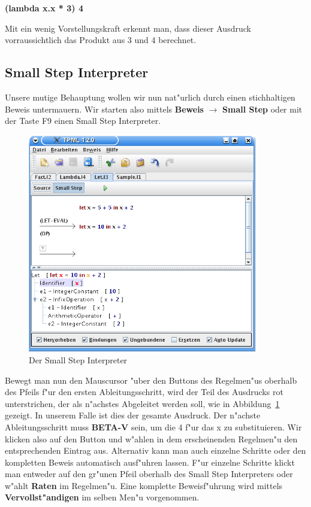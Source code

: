{\bf (lambda x.x * 3) 4}

Mit ein wenig Vorstellungskraft erkennt man, dass dieser Ausdruck
vorraussichtlich das Produkt aus 3 und 4 berechnet.


\subsection{Small Step Interpreter}
Unsere mutige Behauptung wollen wir nun nat"urlich durch einen
stichhaltigen Beweis untermauern. Wir starten also mittels {\bf
Beweis} $\rightarrow$ {\bf Small Step} oder mit der Taste F9 einen
Small Step Interpreter.

\begin{figure}[h]
\begin{center}
\includegraphics[width=10cm]{images/small-step.png}
\caption{Der Small Step Interpreter}
\label{FigureSmallStep}
\end{center}
\end{figure}

Bewegt man nun den Mauscursor "uber den Buttons des Regelmen"us
oberhalb des Pfeils f"ur den ersten Ableitungsschritt, wird der Teil
des Ausdrucks rot unterstrichen, der als n"achstes Abgeleitet werden
soll, wie in Abbildung~\ref{FigureSmallStep} gezeigt.
In unserem Falle ist dies der gesamte Ausdruck. Der n"achste
Ableitungsschritt muss {\bf BETA-V} sein, um die 4 f"ur das x zu
substituieren. Wir klicken also auf den Button und w"ahlen in dem
erscheinenden Regelmen"u den entsprechenden Eintrag aus. Alternativ
kann man auch einzelne Schritte oder den kompletten Beweis
automatisch ausf"uhren lassen. F"ur einzelne Schritte klickt man
entweder auf den gr"unen Pfeil oberhalb des Small Step Interpreters
oder w"ahlt {\bf Raten} im Regelmen"u. Eine komplette Beweisf"uhrung
wird mittels {\bf Vervollst"andigen} im selben Men"u vorgenommen.

